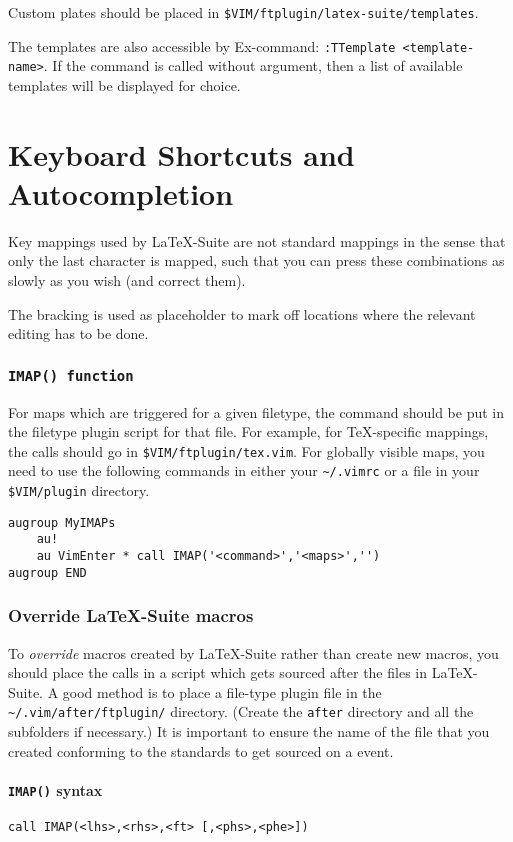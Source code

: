 \documentclass{article}
\newcommand{\syntax}[1]{\PVerb{#1}}
\begin{document}
Custom plates should be placed in \verb|$VIM/ftplugin/latex-suite/templates|.

The templates are also accessible by Ex-command: \lstinline|:TTemplate <template-name>|.
If the command is called without argument, then a list of available templates will be displayed for choice.

\part{Keyboard Shortcuts and Autocompletion}
Key mappings used by \LaTeX{}-Suite are not standard mappings in the sense that only the last character is mapped, such that you can press these combinations as slowly as you wish (and correct them).

The bracking \syntax{<++>} is used as placeholder to mark off locations where the relevant editing has to be done.
\section{\texttt{IMAP() function}}
For maps which are triggered for a given filetype, the \syntax{IMAP{}} command should be put in the filetype plugin script for that file.
For example, for \TeX{}-specific mappings, the \syntax{IMAP()} calls should go in \verb|$VIM/ftplugin/tex.vim|.
For globally visible maps, you need to use the following commands in either your \verb|~/.vimrc| or a file in your \verb|$VIM/plugin| directory. 
\begin{lstlisting}[frame=single]
augroup MyIMAPs
    au!
    au VimEnter * call IMAP('<command>','<maps>','')
augroup END
\end{lstlisting}

\section{Override \LaTeX{}-Suite macros}
To \emph{override} macros created by \LaTeX{}-Suite rather than create new macros, you should place the \syntax{IMAP()} calls in a script which gets sourced after the files in \LaTeX{}-Suite. A good method is to place a file-type plugin file in the \verb|~/.vim/after/ftplugin/| directory. (Create the \verb|after| directory and all the subfolders if necessary.) It is important to ensure the name of the file that you created conforming to the standards to get sourced on a \syntax{FileType} event.

\subsection{\texttt{IMAP()} syntax}
\begin{lstlisting}[frame=single]
call IMAP(<lhs>,<rhs>,<ft> [,<phs>,<phe>])
\end{lstlisting}
\end{document}
